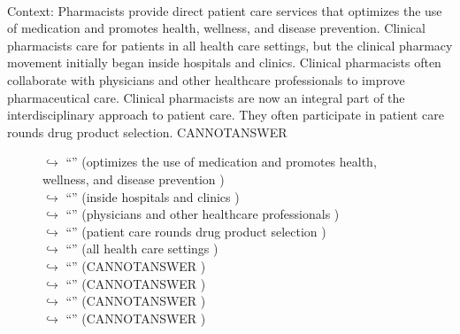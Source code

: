 \documentclass[11pt,a4paper, onecolumn]{article}
\begin{document}
\\ Context: Pharmacists provide direct patient care services that optimizes the use of medication and promotes health, wellness, and disease prevention. Clinical pharmacists care for patients in all health care settings, but the clinical pharmacy movement initially began inside hospitals and clinics. Clinical pharmacists often collaborate with physicians and other healthcare professionals to improve pharmaceutical care. Clinical pharmacists are now an integral part of the interdisciplinary approach to patient care. They often participate in patient care rounds drug product selection. CANNOTANSWER

\begin{figure}[t] \small \begin{tcolorbox}[boxsep=0pt,left=5pt,right=0pt,top=2pt,colback = yellow!5] \begin{dialogue}
 \small 
\colorbox{pink!25}{$\hookrightarrow$}
{ ``'' (optimizes the use of medication and promotes health, wellness, and disease prevention ) }
\\
\colorbox{pink!25}{$\hookrightarrow$}
{ ``'' (inside hospitals and clinics ) }
\\
\colorbox{pink!25}{$\hookrightarrow$}
{ ``'' (physicians and other healthcare professionals ) }
\\
\colorbox{pink!25}{$\hookrightarrow$}
{ ``'' (patient care rounds drug product selection ) }
\\
\colorbox{pink!25}{$\hookrightarrow$}
{ ``'' (all health care settings ) }
\\
\colorbox{pink!25}{$\hookrightarrow$}
{ ``'' (CANNOTANSWER ) }
\\
\colorbox{pink!25}{$\hookrightarrow$}
{ ``'' (CANNOTANSWER ) }
\\
\colorbox{pink!25}{$\hookrightarrow$}
{ ``'' (CANNOTANSWER ) }
\\
\colorbox{pink!25}{$\hookrightarrow$}
{ ``'' (CANNOTANSWER ) }
\\
 \end{dialogue}\end{tcolorbox}\end{figure}
\end{document}
